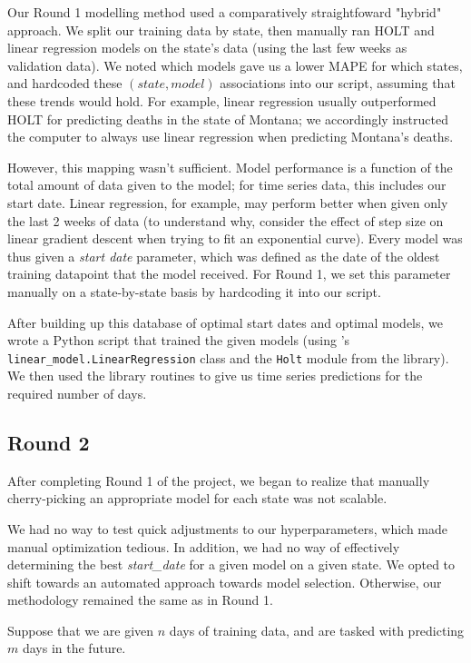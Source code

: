 \documentclass[sigconf,nonacm]{acmart}
\begin{document}
Our Round 1 modelling method used a comparatively straightfoward "hybrid"
approach. We split our training data by state, then manually ran HOLT and
linear regression models on the state's data (using the last few weeks as
validation data). We noted which models gave us a lower MAPE for which states,
and hardcoded these $(state, model)$ associations into our script, assuming
that these trends would hold. For example, linear regression usually
outperformed HOLT for predicting deaths in the state of Montana; we accordingly
instructed the computer to always use linear regression when predicting
Montana's deaths. 

However, this mapping wasn't sufficient. 
Model performance is a function of the total amount of data given to the model;
for time series data, this includes our start date. Linear regression, for
example, may perform better when given only the last 2 weeks of data (to
understand why, consider the effect of step size on linear gradient descent
when trying to fit an exponential curve). 
Every model was thus given a \emph{start date} parameter, which was defined as
the date of the oldest training datapoint that the model received. 
For Round 1, we set this parameter manually on a state-by-state basis by
hardcoding it into our script. 

After building up this database of optimal start dates and optimal models, we
wrote a Python script that trained the given models (using \cite{scikit-learn}'s
\texttt{linear_model.LinearRegression} class and the \texttt{Holt} module from
the \cite{statsmodels} library). We then used the library routines to give us
time series predictions for the required number of days. 

\subsection{Round 2}

After completing Round 1 of the project, we began to realize that manually
cherry-picking an appropriate model for each state was not scalable. 

We had no way to test quick adjustments to our hyperparameters, which made
manual optimization tedious. In addition, we had no way of effectively
determining the best \emph{start_date} for a given model on a given state. 
We opted to shift towards an automated approach towards model selection. 
Otherwise, our methodology remained the same as in Round 1. 

Suppose that we are given $n$ days of training data, and are tasked with
predicting $m$ days in the future. 
\end{document}
